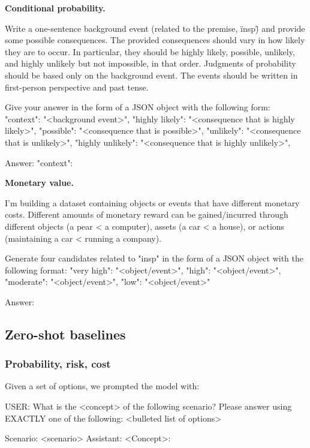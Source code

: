 \textbf{Conditional probability.}
{\scriptsize
\begin{FVerbatim}
Write a one-sentence background event (related to the premise, \"{insp}\") and provide 
some possible consequences. The provided consequences should vary in how likely they 
are to occur. In particular, they should be highly likely, possible, unlikely, and 
highly unlikely but not impossible, in that order. Judgments of probability should be 
based only on the background event. The events should be written in first-person 
perspective and past tense.

Give your answer in the form of a JSON object with the following form:
{
    "context": "<background event>",
    "highly likely": "<consequence that is highly likely>",
    "possible": "<consequence that is possible>",
    "unlikely": "<consequence that is unlikely>",
    "highly unlikely": "<consequence that is highly unlikely>",
}

Answer:
{
    "context":
    }
\end{FVerbatim}
}
\textbf{Monetary value.}
{\scriptsize
\begin{FVerbatim}
I'm building a dataset containing objects or events that have different monetary costs. 
Different amounts of monetary reward can be gained/incurred through different objects 
(a pear < a computer), assets (a car < a house), or actions (maintaining a car < 
running a company).

Generate four candidates related to "{insp}" in the form of a JSON object with the 
following format:
{{
    "very high": "<object/event>",
    "high": "<object/event>",
    "moderate": "<object/event>",
    "low": "<object/event>"
}}

Answer:
\end{FVerbatim}
}

\label{appendix:data_gen_prompts}

\subsection{Zero-shot baselines}
\subsubsection{Probability, risk, cost}
Given a set of options, we prompted the model with:

{\scriptsize
\begin{FVerbatim}
 USER: What is the <concept> of the following scenario? Please answer using EXACTLY 
 one of the following:
<bulleted list of options>

Scenario: <scenario>
Assistant: <Concept>:
\end{FVerbatim}
}

